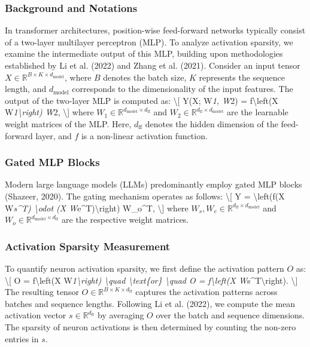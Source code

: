 \documentclass[10pt,twocolumn]{article}
\begin{document}
\subsubsection*{Background and Notations}
In transformer architectures, position-wise feed-forward networks typically consist of a two-layer multilayer perceptron (MLP). To analyze activation sparsity, we examine the intermediate output of this MLP, building upon methodologies established by Li et al. (2022) and Zhang et al. (2021). Consider an input tensor \(X \in \mathbb{R}^{B \times K \times d_{\text{model}}}\), where \(B\) denotes the batch size, \(K\) represents the sequence length, and \(d_{\text{model}}\) corresponds to the dimensionality of the input features. The output of the two-layer MLP is computed as: \textbackslash{}[ Y(X; W\textit{1, W}2) = f\textbackslash{}left(X W\textit{1\textbackslash{}right) W}2, \textbackslash{}] where \(W_1 \in \mathbb{R}^{d_{\text{model}} \times d_{\text{ff}}}\) and \(W_2 \in \mathbb{R}^{d_{\text{ff}} \times d_{\text{model}}}\) are the learnable weight matrices of the MLP. Here, \(d_{\text{ff}}\) denotes the hidden dimension of the feed-forward layer, and \(f\) is a non-linear activation function.
\subsubsection*{Gated MLP Blocks}
Modern large language models (LLMs) predominantly employ gated MLP blocks (Shazeer, 2020). The gating mechanism operates as follows: \textbackslash{}[ Y = \textbackslash{}left(f(X W\textit{s\textasciicircum{}T) \textbackslash{}odot (X W}e\textasciicircum{}T)\textbackslash{}right) W\_o\textasciicircum{}T, \textbackslash{}] where \(W_s, W_e \in \mathbb{R}^{d_{\text{ff}} \times d_{\text{model}}}\) and \(W_o \in \mathbb{R}^{d_{\text{model}} \times d_{\text{ff}}}\) are the respective weight matrices.
\subsubsection*{Activation Sparsity Measurement}
To quantify neuron activation sparsity, we first define the activation pattern \(O\) as: \textbackslash{}[ O = f\textbackslash{}left(X W\textit{1\textbackslash{}right) \textbackslash{}quad \textbackslash{}text\{or\} \textbackslash{}quad O = f\textbackslash{}left(X W}s\textasciicircum{}T\textbackslash{}right). \textbackslash{}] The resulting tensor \(O \in \mathbb{R}^{B \times K \times d_{\text{ff}}}\) captures the activation patterns across batches and sequence lengths. Following Li et al. (2022), we compute the mean activation vector \(s \in \mathbb{R}^{d_{\text{ff}}}\) by averaging \(O\) over the batch and sequence dimensions. The sparsity of neuron activations is then determined by counting the non-zero entries in \(s\).
\end{document}
